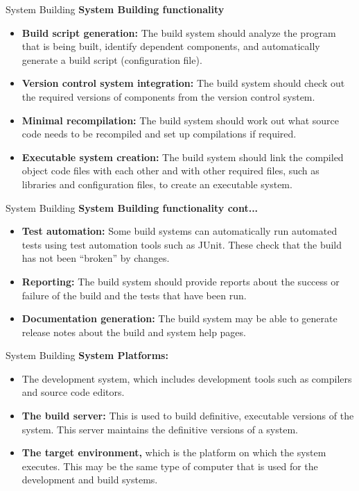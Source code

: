 \documentclass{beamer}
\begin{document}
\begin{frame}{System Building}
	\textbf{System Building functionality}
	\begin{itemize}
		\item \textbf{Build script generation:} The build system should analyze the program that is being built, identify 
		dependent components, and automatically generate a build script (configuration file).
		\item \textbf{Version control system integration:} The build system should check out the required versions of 
		components from the version control system.
		\item \textbf{Minimal recompilation:} The build system should work out what source code needs to be recompiled 
		and set up compilations if required.
		\item \textbf{Executable system creation:} The build system should link the compiled object code files with each 
		other and with other required files, such as libraries and configuration files, to create an executable 
		system.
	\end{itemize}
\end{frame}
\begin{frame}{System Building}
	\textbf{System Building functionality cont...}
	\begin{itemize}
		\item \textbf{Test automation:} Some build systems can automatically run automated tests using test automation 
		tools such as JUnit. These check that the build has not been “broken” by changes.
		\item \textbf{Reporting:} The build system should provide reports about the success or failure of the build and the 
		tests that have been run.
		\item \textbf{Documentation generation:} The build system may be able to generate release notes about the build 
		and system help pages.
	\end{itemize}
\end{frame}
\begin{frame}{System Building}
	\textbf{System Platforms:}
	\begin{itemize}
		\item The development system, which includes development tools such as compilers and source code editors.
	\item \textbf{The build server:} This is used to build definitive, executable versions of the system. This server 
		maintains the definitive versions of a system.
		\item \textbf{The target environment,} which is the platform on which the system executes. This may be the same 
		type of computer that is used for the development and build systems.
	\end{itemize}
\end{frame}
\end{document}
